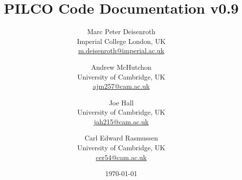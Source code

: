 \newcommand{\te}[1]{\text{#1}}
\newcommand{\dpp}{\mathrm{\partial}}
\newcommand{\pdiff}[2]{\frac{\dpp #1}{\dpp #2}}

\setcounter{secnumdepth}{3}

\title{\bf PILCO Code Documentation v0.9} 

\author{Marc Peter Deisenroth\\
Imperial College London, UK\\
\url{m.deisenroth@imperial.ac.uk}
 \and 
Andrew McHutchon\\
University of Cambridge, UK \\
\url{ajm257@cam.ac.uk}
\and 
Joe Hall\\
University of Cambridge, UK\\
\url{jah215@cam.ac.uk}
\and
 Carl Edward Rasmussen\\
University of Cambridge, UK\\
\url{cer54@cam.ac.uk}
}

\date{\today}

